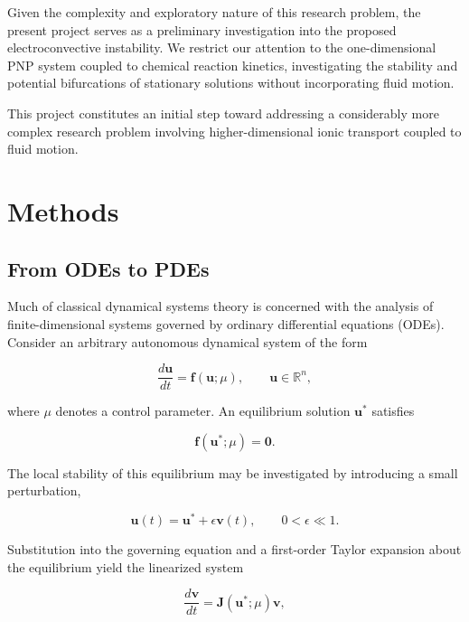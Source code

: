 \documentclass[11pt]{article}
\begin{document}
Given the complexity and exploratory nature of
this research problem, the present project serves
as a preliminary investigation into the proposed
electroconvective instability. We restrict our
attention to the one-dimensional
PNP system coupled to chemical
reaction kinetics, investigating the stability
and potential bifurcations of stationary solutions
without incorporating fluid motion.

This project constitutes an initial step toward
addressing a considerably more complex research
problem involving higher-dimensional ionic
transport coupled to fluid motion.


\section{Methods}

\subsection{From ODEs to PDEs}

Much of classical dynamical systems theory is concerned
with the analysis of finite-dimensional systems governed
by ordinary differential equations (ODEs). Consider an
arbitrary autonomous dynamical system of the form

\begin{equation}
    \frac{d\bm{u}}{dt}
    = \bm{f}(\bm{u};\mu),
    \qquad \bm{u}\in\mathbb{R}^n,
\end{equation}

where $\mu$ denotes a control parameter. An equilibrium
solution $\bm{u}^*$ satisfies

\begin{equation}
    \bm{f}(\bm{u}^*;\mu)=\bm{0}.
\end{equation}

The local stability of this equilibrium may be
investigated by introducing a small perturbation,

\begin{equation}
    \bm{u}(t)=\bm{u}^*+\epsilon\bm{v}(t),
    \qquad 0<\epsilon\ll 1.
\end{equation}

Substitution into the governing equation and a
first-order Taylor expansion about the equilibrium
yield the linearized system

\begin{equation}
    \frac{d\bm{v}}{dt}
    =\bm{J}(\bm{u}^*;\mu)\bm{v},
\end{equation}
\end{document}
